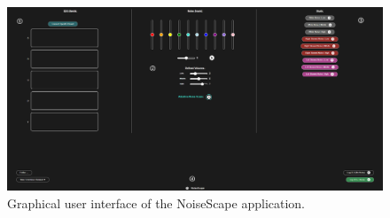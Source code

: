 \begin{figure}[!t]
  \centering
  \includegraphics[width=\textwidth]{interface.png}
  \caption{Graphical user interface of the NoiseScape application.}
  \label{fig:interface}
\end{figure}

